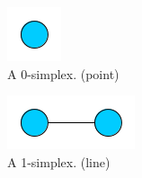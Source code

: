 \begin{figure}[h!]
        \centering
        \begin{subfigure}[b]{0.1\textwidth}
                \includegraphics[width=\textwidth]{img/0simplex.png}
                \caption{A 0-simplex. (point)}
                \label{fig:0simplex}
        \end{subfigure}%
        \qquad
        \begin{subfigure}[b]{0.2\textwidth}
                \includegraphics[width=\textwidth]{img/1simplex.png}
                \caption{A 1-simplex. (line)}
                \label{fig:1simplex}
        \end{subfigure}
        ~
        \begin{subfigure}[b]{0.3\textwidth}

\end{subfigure}
\end{figure}
